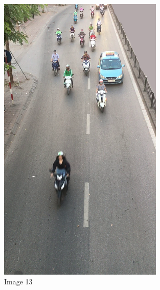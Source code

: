 \begin{center}
    \begin{figure}[H]
        \centering
      \includegraphics[width=0.7\textwidth]{Chapters/Fig/13}
      \caption{Image 13}
      \label{fig:img13}
  \end{figure}
\end{center}

